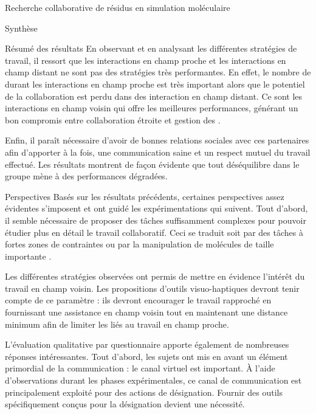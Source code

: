 \documentclass[myfrancais]{mythesis}
\begin{document}
\begin{mychapter}{Recherche collaborative de résidus en simulation moléculaire}
\begin{mysection}{Synthèse}
\begin{mysubsection}{Résumé des résultats}
				En observant et en analysant les différentes stratégies de travail, il ressort que les interactions en champ proche et les interactions en champ distant ne sont pas des stratégies très performantes.
				En effet, le nombre de  durant les interactions en champ proche est très important alors que le potentiel de la collaboration est perdu dans des interaction en champ distant.
				Ce sont les interactions en champ voisin qui offre les meilleures performances, générant un bon compromis entre collaboration étroite et gestion des .

				Enfin, il paraît nécessaire d'avoir de bonnes relations sociales avec ces partenaires afin d'apporter à la fois, une communication saine et un respect mutuel du travail effectué.
				Les résultats montrent de façon évidente que tout déséquilibre dans le groupe mène à des performances dégradées.
			\end{mysubsection}
			\begin{mysubsection}{Perspectives}
				Basés sur les résultats précédents, certaines perspectives assez évidentes s'imposent et ont guidé les expérimentations qui suivent.
				Tout d'abord, il semble nécessaire de proposer des tâches suffisamment complexes pour pouvoir étudier plus en détail le travail collaboratif.
				Ceci se traduit soit par des tâches à fortes zones de contraintes  ou par la manipulation de molécules de taille importante .

				Les différentes stratégies observées ont permis de mettre en évidence l'intérêt du travail en champ voisin.
				Les propositions d'outils visuo-haptiques devront tenir compte de ce paramètre : ils devront encourager le travail rapproché en fournissant une assistance en champ voisin tout en maintenant une distance minimum afin de limiter les  liés au travail en champ proche.

				L'évaluation qualitative par questionnaire apporte également de nombreuses réponses intéressantes.
				Tout d'abord, les sujets ont mis en avant un élément primordial de la communication : le canal virtuel est important.
				À l'aide d'observations durant les phases expérimentales, ce canal de communication est principalement exploité pour des actions de désignation.
				Fournir des outils spécifiquement conçus pour la désignation devient une nécessité.


\end{mysubsection}
\end{mysection}
\end{mychapter}
\end{document}
